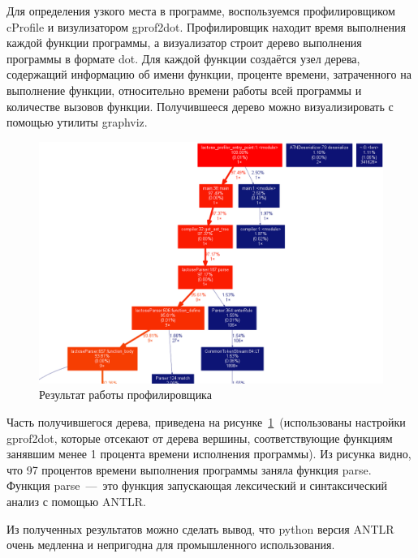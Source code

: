 \documentclass[12pt,a4paper,oneside]{extarticle}
\begin{document}
        Для определения узкого места в программе, воспользуемся профилировщиком cProfile и визулизатором gprof2dot.
        Профилировщик находит время выполнения каждой функции программы, а визуализатор строит дерево выполнения программы в формате dot.
        Для каждой функции создаётся узел дерева, содержащий информацию об имени функции, проценте времени, затраченного на выполнение функции, относительно времени работы всей программы и количестве вызовов функции.
        Получившееся дерево можно визуализировать с помощью утилиты graphviz.

        \begin{figure}[h!]
            \center
            \includegraphics[scale=0.3]{lactose_stats.png}
            \caption{Результат работы профилировщика}
            \label{pic:stats}
        \end{figure}

        Часть получившегося дерева, приведена на рисунке~\ref{pic:stats}~(использованы настройки gprof2dot, которые отсекают от дерева вершины, соответствующие функциям занявшим менее 1 процента времени исполнения программы).
        Из рисунка видно, что 97 процентов времени выполнения программы заняла функция parse. Функция parse~---~это функция запускающая лексический и синтаксический анализ с помощью ANTLR.

        Из полученных результатов можно сделать вывод, что python версия ANTLR очень медленна и непригодна для промышленного использования.
    
\end{document}
